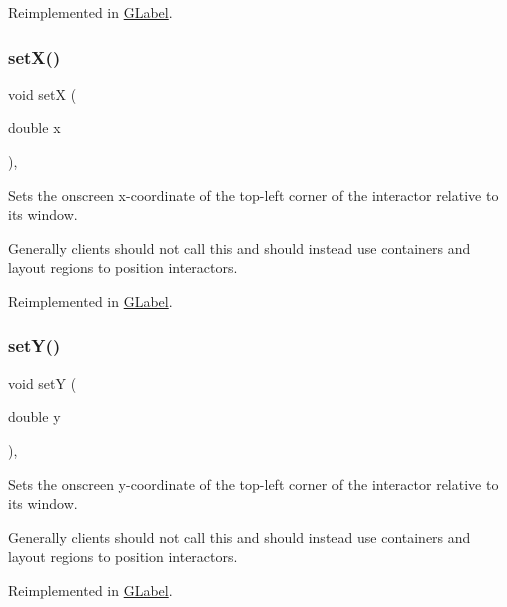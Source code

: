 Reimplemented in \mbox{\hyperlink{classGLabel_aca9b9c666c4162ab0a27a10530bc0762}{G\+Label}}.

\mbox{\label{classGInteractor_a9c18fcc579333bf9653d13ad2b372e39}} 
\subsubsection{\texorpdfstring{set\+X()}{setX()}}
{\footnotesize\ttfamily void setX (\begin{DoxyParamCaption}\item[{double}]{x }\end{DoxyParamCaption})\hspace{0.3cm}{\ttfamily [virtual]}, {\ttfamily [inherited]}}



Sets the onscreen x-\/coordinate of the top-\/left corner of the interactor relative to its window. 

Generally clients should not call this and should instead use containers and layout regions to position interactors. 

Reimplemented in \mbox{\hyperlink{classGLabel_af7260dc32f150e3a5072e7e8eb2628b1}{G\+Label}}.

\mbox{\label{classGInteractor_a7d57e2a5c35d27feb58fd498a3cf82b9}} 
\subsubsection{\texorpdfstring{set\+Y()}{setY()}}
{\footnotesize\ttfamily void setY (\begin{DoxyParamCaption}\item[{double}]{y }\end{DoxyParamCaption})\hspace{0.3cm}{\ttfamily [virtual]}, {\ttfamily [inherited]}}



Sets the onscreen y-\/coordinate of the top-\/left corner of the interactor relative to its window. 

Generally clients should not call this and should instead use containers and layout regions to position interactors. 

Reimplemented in \mbox{\hyperlink{classGLabel_a59633abb35b676c54d88ea6cd384fc55}{G\+Label}}.

